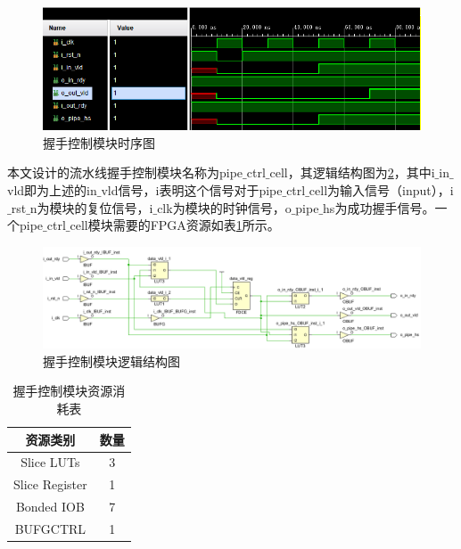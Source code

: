 \begin{figure}[htb]
    \centering
    \includegraphics[width=14cm]{fig/5-fig/握手控制模块时序图.jpg}
    \caption{握手控制模块时序图}
    \label{fig:握手控制模块时序图}
\end{figure}

本文设计的流水线握手控制模块名称为pipe$\_$ctrl$\_$cell，其逻辑结构图为\ref{fig:握手控制模块逻辑结构图}，其中i$\_$in$\_$vld即为上述的in$\_$vld信号，i表明这个信号对于pipe$\_$ctrl$\_$cell为输入信号（input），i$\_$rst$\_$n为模块的复位信号，i$\_$clk为模块的时钟信号，o$\_$pipe$\_$hs为成功握手信号。一个pipe$\_$ctrl$\_$cell模块需要的FPGA资源如表\ref{tab:握手控制模块资源消耗表}所示。
\begin{figure}[htb]
    \centering
    \includegraphics[width=14cm]{fig/5-fig/握手控制模块逻辑结构图.jpg}
    \caption{握手控制模块逻辑结构图}
    \label{fig:握手控制模块逻辑结构图}
  \end{figure}

  \begin{table}[H]
    \centering
    \caption{握手控制模块资源消耗表}
    \label{tab:握手控制模块资源消耗表}
    \begin{tabular}{c|c}
        \hline
        资源类别             & 数量  \\ \hline
        Slice LUTs          & 3     \\ \hline
        Slice Register      & 1     \\ \hline
        Bonded IOB          & 7     \\ \hline
        BUFGCTRL            & 1     \\ \hline
    \end{tabular}
  \end{table}

